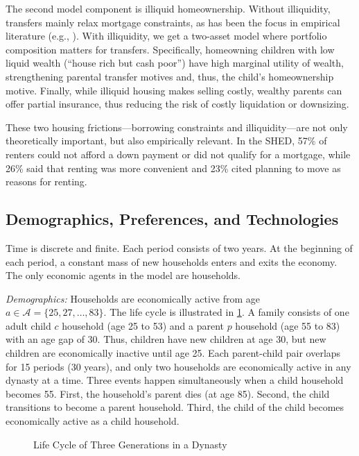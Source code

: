 \documentclass[12pt]{article}
\begin{document}
The second model component is illiquid homeownership. Without illiquidity, transfers mainly relax mortgage constraints, as has been the focus in empirical literature (e.g., \cite{Blickle2019,Engelhardt1998,Guiso2002,Lee2018}). With illiquidity, we get a two-asset model where portfolio composition matters for transfers. Specifically, homeowning children with low liquid wealth (``house rich but cash poor'') have high marginal utility of wealth, strengthening parental transfer motives and, thus, the child's homeownership motive. Finally, while illiquid housing makes selling costly, wealthy parents can offer partial insurance, thus reducing the risk of costly liquidation or downsizing.

These two housing frictions---borrowing constraints and illiquidity---are not only theoretically important, but also empirically relevant. In the SHED, 57\% of renters could not afford a down payment or did not qualify for a mortgage, while 26\% said that renting was more convenient and 23\% cited planning to move as reasons for renting. 

\subsection{Demographics, Preferences, and Technologies}
Time is discrete and finite. Each period consists of two years. At the beginning of each period, a constant mass of new households enters and exits the economy. The only economic agents in the model are households.

\textit{Demographics:} Households are economically active from age $a\in \mathcal{A}=\{25,\allowbreak 27,\allowbreak\dots,\allowbreak 83\}$. The life cycle is illustrated in \ref{fig:overview}. A family consists of one adult child $c$ household (age 25 to 53) and a parent $p$ household (age 55 to 83) with an age gap of 30. Thus, children have new children at age 30, but new children are economically inactive until age 25. Each parent-child pair overlaps for 15 periods (30 years), and only two households are economically active in any dynasty at a time. Three events happen simultaneously when a child household becomes 55. First, the household's parent dies (at age 85). Second, the child transitions to become a parent household. Third, the child of the child becomes economically active as a child household.

\begin{figure}\begin{center}
	\caption{Life Cycle of Three Generations in a Dynasty }\label{fig:overview}
	
\end{center}
\end{figure} 
\end{document}
